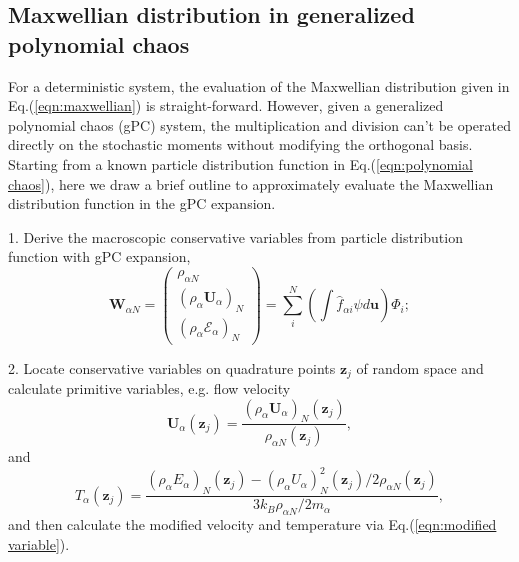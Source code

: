 \documentclass[preprint,3p,12pt,sort&compress]{elsarticle}
\begin{document}
\subsection{Maxwellian distribution in generalized polynomial chaos}\label{sec:maxwellian evaluation}

For a deterministic system, the evaluation of the Maxwellian distribution given in Eq.(\ref{eqn:maxwellian}) is straight-forward.
However, given a generalized polynomial chaos (gPC) system, the multiplication and division can't be operated directly on the stochastic moments without modifying the orthogonal basis.
Starting from a known particle distribution function in Eq.(\ref{eqn:polynomial chaos}), here we draw a brief outline to approximately evaluate the Maxwellian distribution function in the gPC expansion.

1. Derive the macroscopic conservative variables from particle distribution function with gPC expansion,
\begin{equation}
\mathbf{W}_{\alpha N}  =\left(
\begin{matrix}
\rho_{\alpha N} \\
(\rho_\alpha \mathbf U_\alpha)_{N} \\
(\rho_\alpha \mathscr E_\alpha)_{N}
\end{matrix}
\right)=\sum_{i}^N \left( \int \hat f_{\alpha i} \psi d\mathbf u \right) \Phi_ i ;
\end{equation}

2. Locate conservative variables on quadrature points $\mathbf z_j$ of random space and calculate primitive variables, e.g. flow velocity
\begin{equation}
\mathbf U_\alpha(\mathbf z_j)
= \frac{(\rho_\alpha \mathbf U_\alpha)_N(\mathbf z_j)}{\rho_{\alpha N} (\mathbf z_j)},
\end{equation}
and
\begin{equation}
T_\alpha(\mathbf z_j) = \frac{ (\rho_\alpha E_\alpha)_N(\mathbf z_j) - (\rho_\alpha U_\alpha)_N^2(\mathbf z_j)/2\rho_{\alpha N}(\mathbf z_j) }
{3 k_B \rho_{\alpha N} / 2m_\alpha},
\end{equation}
and then calculate the modified velocity and temperature via Eq.(\ref{eqn:modified variable}).
\end{document}

